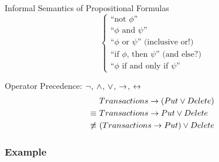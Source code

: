 \begin{frame}{\myframetitle}
\begin{mycolumns}
\begin{definition}{Informal Semantics of Propositional Formulas}
\begin{equation*}
\begin{cases}
					\text{``not $\phi$''} \\
					\text{``$\phi$ and $\psi$''} \\
					\text{``$\phi$ or $\psi$'' (inclusive or!)} \\
					\text{``if $\phi$, then $\psi$'' (and else?)} \\
					\text{``$\phi$ if and only if $\psi$''}
				\end{cases}
			\end{equation*}
		\end{definition}
		\begin{example}{Operator Precedence: $\neg$, $\wedge$, $\vee$, $\rightarrow$, $\leftrightarrow$}
			\vspace*{-4ex} %
			\begin{align*}
				           &~Transactions \rightarrow (Put \vee Delete) \\
				\equiv     &~Transactions \rightarrow Put \vee Delete \\
				\not\equiv &~(Transactions \rightarrow Put) \vee Delete
			\end{align*}
		\end{example}
	\end{mycolumns}
\end{frame}

\subsubsection*{Example}

